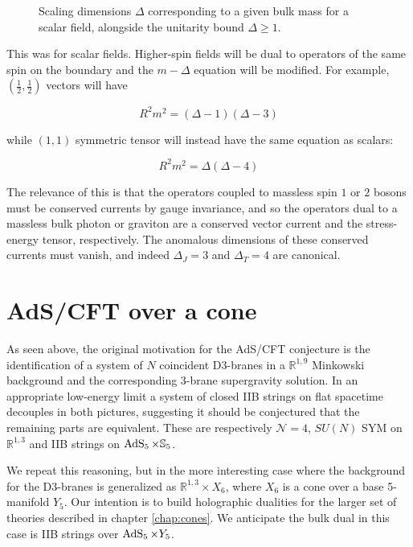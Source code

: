 \begin{figure}[H]
\centering

\caption{Scaling dimensions $\Delta$ corresponding to a given bulk mass for a scalar field, alongside the unitarity bound $\Delta\geq 1$.}
\end{figure}

This was for scalar fields. Higher-spin fields will be dual to operators of the same spin on the boundary and the $m-\Delta$ equation will be modified. For example, $(\frac{1}{2},\frac{1}{2})$ vectors will have

\begin{equation}
	R^2 m^2 = (\Delta-1)(\Delta-3)
	\label{}
\end{equation}

while $(1,1)$ symmetric tensor will instead have the same equation as scalars:

\begin{equation}
	R^2 m^2 = \Delta (\Delta-4)
	\label{}
\end{equation}

The relevance of this is that the operators coupled to massless spin $1$ or $2$ bosons must be conserved currents by gauge invariance, and so the operators dual to a massless bulk photon or graviton are a conserved vector current and the stress-energy tensor, respectively. The anomalous dimensions of these conserved currents must vanish, and indeed $\Delta_J = 3$ and $\Delta_T = 4$ are canonical.

\section{AdS/CFT over a cone}

As seen above, the original motivation for the AdS/CFT conjecture is the identification of a system of $N$ coincident D3-branes in a $\mathbb{R}^{1,9}$ Minkowski background and the corresponding 3-brane supergravity solution. In an appropriate low-energy limit a system of closed IIB strings on flat spacetime decouples in both pictures, suggesting it should be conjectured that the remaining parts are equivalent. These are respectively $\mathcal{N}=4$, $SU(N)$ SYM on $\mathbb{R}^{1,3}$ and IIB strings on $\operatorname{AdS}_{5} \times \mathbb{S}_5$.

We repeat this reasoning, but in the more interesting case where the background for the D3-branes is generalized as $\mathbb{R}^{1,3} \times X_6$, where $X_6$ is a cone over a base 5-manifold $Y_5$. Our intention is to build holographic dualities for the larger set of theories described in chapter \ref{chap:cones}. We anticipate the bulk dual in this case is IIB strings over $\operatorname{AdS}_{5} \times Y_5$.

